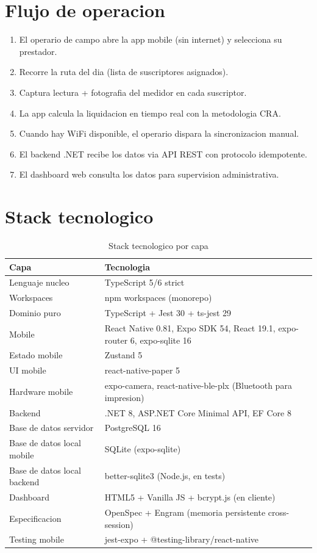 \documentclass[11pt,a4paper,oneside]{report}
\begin{document}
\section{Flujo de operacion}

\begin{enumerate}[leftmargin=*]
    \item El operario de campo abre la app mobile (sin internet) y selecciona su prestador.
    \item Recorre la ruta del dia (lista de suscriptores asignados).
    \item Captura lectura + fotografia del medidor en cada suscriptor.
    \item La app calcula la liquidacion en tiempo real con la metodologia CRA.
    \item Cuando hay WiFi disponible, el operario dispara la sincronizacion manual.
    \item El backend .NET recibe los datos via API REST con protocolo idempotente.
    \item El dashboard web consulta los datos para supervision administrativa.
\end{enumerate}

\section{Stack tecnologico}

\begin{table}[h]
\centering
\caption{Stack tecnologico por capa}
\begin{tabularx}{\textwidth}{L{5cm} X}
\toprule
\textbf{Capa} & \textbf{Tecnologia} \\
\midrule
Lenguaje nucleo & TypeScript 5/6 strict \\
Workspaces & npm workspaces (monorepo) \\
Dominio puro & TypeScript + Jest 30 + ts-jest 29 \\
Mobile & React Native 0.81, Expo SDK 54, React 19.1, expo-router 6, expo-sqlite 16 \\
Estado mobile & Zustand 5 \\
UI mobile & react-native-paper 5 \\
Hardware mobile & expo-camera, react-native-ble-plx (Bluetooth para impresion) \\
Backend & .NET 8, ASP.NET Core Minimal API, EF Core 8 \\
Base de datos servidor & PostgreSQL 16 \\
Base de datos local mobile & SQLite (expo-sqlite) \\
Base de datos local backend & better-sqlite3 (Node.js, en tests) \\
Dashboard & HTML5 + Vanilla JS + bcrypt.js (en cliente) \\
Especificacion & OpenSpec + Engram (memoria persistente cross-session) \\
Testing mobile & jest-expo + @testing-library/react-native \\
\bottomrule
\end{tabularx}
\end{table}
\end{document}
